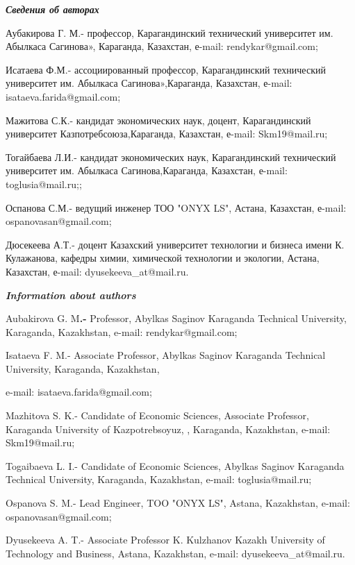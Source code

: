\begin{info}
\hspace{1em}\emph{{\bfseries Сведения об авторах}}

Аубакирова Г. М.- профессор, Карагандинский технический университет
им.  Абылкаса Сагинова», Караганда, Казахстан, е-mail:
rendykar@gmail.com;

Исатаева Ф.М.- ассоциированный профессор, Карагандинский технический
университет им. Абылкаса Сагинова»,Караганда, Казахстан, е-mail:
isataeva.farida@gmail.com;

Мажитова С.К.- кандидат экономических наук, доцент, Карагандинский
университет Казпотребсоюза,Караганда, Казахстан, е-mail:
Skm19@mail.ru;

Тогайбаева Л.И.- кандидат экономических наук, Карагандинский
технический университет им. Абылкаса Сагинова,Караганда, Казахстан,
е-mail: toglusia@mail.ru;;

Оспанова С.М.- ведущий инженер ТОО "ONYX LS", Астана, Казахстан,
е-mail: ospanovasan@gmail.com;

Дюсекеева А.Т.- доцент Казахский университет технологии и бизнеса
имени К. Кулажанова, кафедры химии, химической технологии и экологии,
Астана, Казахстан, е-mail: dyusekeeva\_at@mail.ru.

\hspace{1em}\emph{{\bfseries Information about authors}}

Aubakirova G. M{\bfseries .-} Professor, Abylkas Saginov Karaganda
Technical University, Karaganda, Kazakhstan, e-mail:
rendykar@gmail.com;

Isataeva F. M.- Associate Professor, Abylkas Saginov Karaganda
Technical University, Karaganda, Kazakhstan,

e-mail: isataeva.farida@gmail.com;

Mazhitova S. K.- Candidate of Economic Sciences, Associate Professor,
Karaganda University of Kazpotrebsoyuz, , Karaganda, Kazakhstan,
e-mail: Skm19@mail.ru;

Togaibaeva L. I.- Candidate of Economic Sciences, Abylkas Saginov
Karaganda Technical University, Karaganda, Kazakhstan, e-mail:
toglusia@mail.ru;

Ospanova S. M.- Lead Engineer, TOO "ONYX LS", Astana, Kazakhstan,
e-mail: ospanovasan@gmail.com;

Dyusekeeva A. T.- Associate Professor K. Kulzhanov Kazakh University
of Technology and Business, Astana, Kazakhstan, e-mail:
dyusekeeva\_at@mail.ru.
\end{info}
